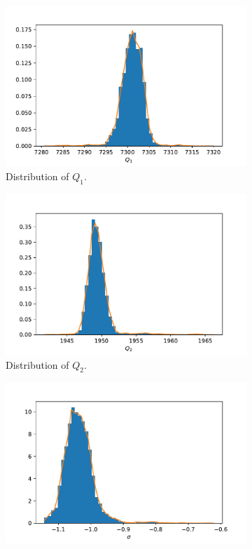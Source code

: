 \begin{figure}[h!]
\begin{subfigure}{.5\textwidth}
  \includegraphics[width=\linewidth]{figures/bayesian/SIM_Q/hist_Q1.pdf}
  \caption{Distribution of $Q_{1}$.}
  \label{fig:subhistTm1}
\end{subfigure}%
\begin{subfigure}{.5\textwidth}
  \centering
  \includegraphics[width=\linewidth]{figures/bayesian/SIM_Q/hist_Q2.pdf}
  \caption{Distribution of $Q_{2}$.}
  \label{fig:subhistTm2}
\end{subfigure}
\newline
\begin{subfigure}{.5\textwidth}
  \centering
  \includegraphics[width=\linewidth]{figures/bayesian/SIM_Q/hist_sigma.pdf}

\end{subfigure}
\end{figure}
